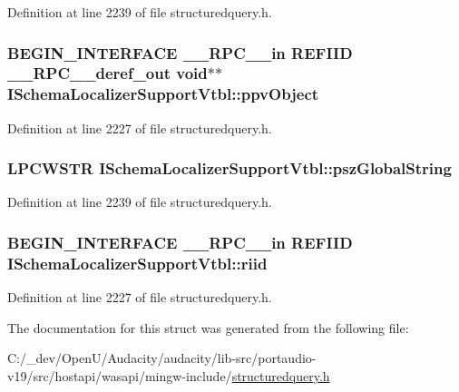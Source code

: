 Definition at line 2239 of file structuredquery.\+h.

\subsubsection[{\texorpdfstring{ppv\+Object}{ppvObject}}]{\setlength{\rightskip}{0pt plus 5cm}B\+E\+G\+I\+N\+\_\+\+I\+N\+T\+E\+R\+F\+A\+CE {\bf \+\_\+\+\_\+\+R\+P\+C\+\_\+\+\_\+in} {\bf R\+E\+F\+I\+ID} {\bf \+\_\+\+\_\+\+R\+P\+C\+\_\+\+\_\+deref\+\_\+out} {\bf void}$\ast$$\ast$ I\+Schema\+Localizer\+Support\+Vtbl\+::ppv\+Object}\hypertarget{struct_i_schema_localizer_support_vtbl_a7910c2ee008371684090269dd3f8d985}{}\label{struct_i_schema_localizer_support_vtbl_a7910c2ee008371684090269dd3f8d985}


Definition at line 2227 of file structuredquery.\+h.

\subsubsection[{\texorpdfstring{psz\+Global\+String}{pszGlobalString}}]{ {\bf L\+P\+C\+W\+S\+TR} I\+Schema\+Localizer\+Support\+Vtbl\+::psz\+Global\+String}\hypertarget{struct_i_schema_localizer_support_vtbl_ac5913a71b778df0daacab45ed2125d6c}{}\label{struct_i_schema_localizer_support_vtbl_ac5913a71b778df0daacab45ed2125d6c}


Definition at line 2239 of file structuredquery.\+h.

\subsubsection[{\texorpdfstring{riid}{riid}}]{\setlength{\rightskip}{0pt plus 5cm}B\+E\+G\+I\+N\+\_\+\+I\+N\+T\+E\+R\+F\+A\+CE {\bf \+\_\+\+\_\+\+R\+P\+C\+\_\+\+\_\+in} {\bf R\+E\+F\+I\+ID} I\+Schema\+Localizer\+Support\+Vtbl\+::riid}\hypertarget{struct_i_schema_localizer_support_vtbl_a18dd6d8313c5ab9b608902591bf9ebd8}{}\label{struct_i_schema_localizer_support_vtbl_a18dd6d8313c5ab9b608902591bf9ebd8}


Definition at line 2227 of file structuredquery.\+h.



The documentation for this struct was generated from the following file\+:\begin{DoxyCompactItemize}
\item 
C\+:/\+\_\+dev/\+Open\+U/\+Audacity/audacity/lib-\/src/portaudio-\/v19/src/hostapi/wasapi/mingw-\/include/\hyperlink{structuredquery_8h}{structuredquery.\+h}\end{DoxyCompactItemize}
